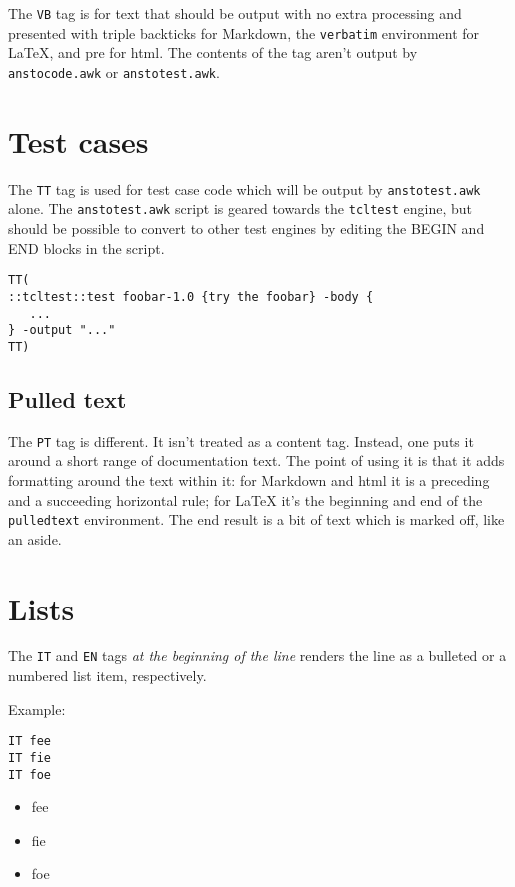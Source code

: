 The \texttt{VB} tag is for text that should be output with no extra processing and presented with triple backticks for Markdown, the \texttt{verbatim} environment for \LaTeX{}, and pre for html. The contents of the tag aren't output by \texttt{anstocode.awk} or \texttt{anstotest.awk}.

\section{Test cases}
\label{test-cases}

The \texttt{TT} tag is used for test case code which will be output by \texttt{anstotest.awk} alone. The \texttt{anstotest.awk} script is geared towards the \texttt{tcltest} engine, but should be possible to convert to other test engines by editing the BEGIN and END blocks in the script.

\begin{verbatim}
TT(
::tcltest::test foobar-1.0 {try the foobar} -body {
   ...
} -output "..."
TT)
\end{verbatim}

\begin{pulledtext}
\section{Pulled text}
\label{pulled-text}

The \texttt{PT} tag is different. It isn't treated as a content tag. Instead, one puts it around a short range of documentation text. The point of using it is that it adds formatting around the text within it: for Markdown and html it is a preceding and a succeeding horizontal rule; for \LaTeX{} it's the beginning and end of the \texttt{pulledtext} environment. The end result is a bit of text which is marked off, like an aside.

\end{pulledtext}

\section{Lists}
\label{lists}

The \texttt{IT} and \texttt{EN} tags \emph{at the beginning of the line} renders the line as a bulleted or a numbered list item, respectively.


Example:

\begin{verbatim}
IT fee
IT fie
IT foe
\end{verbatim}
\begin{itemize}
\item  fee
\item  fie
\item  foe
\end{itemize}

